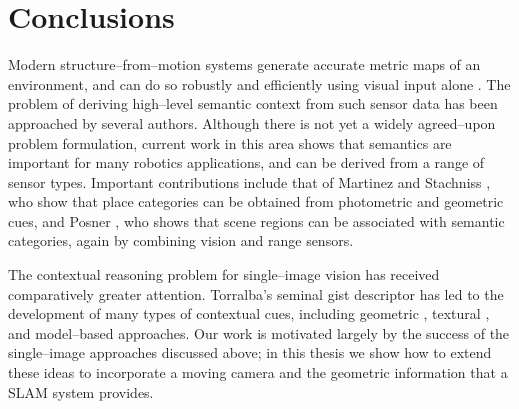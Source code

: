 \section{Conclusions}
Modern structure--from--motion systems generate accurate metric maps
of an environment, and can do so robustly and efficiently using visual
input alone \cite{Klein07}. The problem of deriving high--level
semantic context from such sensor data has been approached by several
authors. Although there is not yet a widely agreed--upon problem
formulation, current work in this area shows that semantics are
important for many robotics applications, and can be derived from a
range of sensor types. Important contributions include that of
Martinez \cite{Mozos05} and Stachniss \cite{Stachniss05}, who show
that place categories can be obtained from photometric and geometric
cues, and Posner \cite{Posner08}, who shows that scene regions can be
associated with semantic categories, again by combining vision and
range sensors.

The contextual reasoning problem for single--image vision has received
comparatively greater attention. Torralba's seminal gist descriptor
\cite{Torralba03} has led to the development of many types of
contextual cues, including geometric \cite{Hoiem05,Saxena09}, textural
\cite{Heitz08}, and model--based \cite{Lee09} approaches. Our work is
motivated largely by the success of the single--image approaches
discussed above; in this thesis we show how to extend these ideas to
incorporate a moving camera and the geometric information that a SLAM
system provides.

